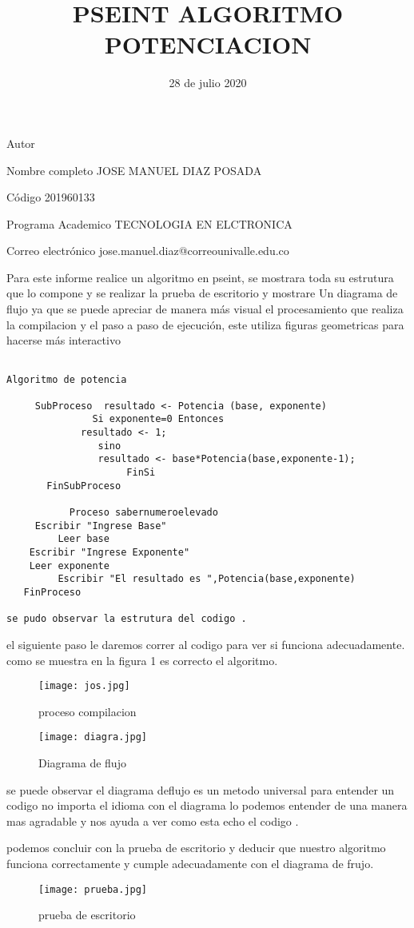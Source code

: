 \documentclass[letterpaper,12pt]{article}
\title{PSEINT ALGORITMO  POTENCIACION }
\date{28 de julio 2020}
\begin{document}
\maketitle

 \begin{cvlist}{Autor}
	\item[Nombre completo]  JOSE MANUEL DIAZ POSADA
	\item[Código]201960133 
	\item[Programa Academico]TECNOLOGIA EN ELCTRONICA 
	\item[Correo electrónico] jose.manuel.diaz@correounivalle.edu.co
\end{cvlist}

Para este informe realice un algoritmo en pseint, se mostrara toda su estrutura que lo compone y se realizar la prueba de escritorio y  mostrare Un diagrama de flujo ya que se puede apreciar de manera más visual el procesamiento que realiza la compilacion y el paso a paso de ejecución, este utiliza  figuras geometricas para hacerse más interactivo
\begin{verbatim}

Algoritmo de potencia

     SubProceso  resultado <- Potencia (base, exponente)
               Si exponente=0 Entonces
             resultado <- 1;
                sino 
                resultado <- base*Potencia(base,exponente-1); 
                     FinSi
       FinSubProceso

           Proceso sabernumeroelevado 
     Escribir "Ingrese Base"
         Leer base
    Escribir "Ingrese Exponente"
    Leer exponente
         Escribir "El resultado es ",Potencia(base,exponente)
   FinProceso

se pudo observar la estrutura del codigo .
\end{verbatim}
el siguiente paso  le daremos correr al codigo para ver si funciona adecuadamente.
como se muestra en la figura 1 es correcto el algoritmo.
\begin{figure}[h!]
\centering
\texttt{[image: jos.jpg]}
\caption{proceso compilacion}
\label{Figura: 1}
\end{figure}

\begin{figure}[h!] 
\centering
\texttt{[image: diagra.jpg]} 
\caption{Diagrama de flujo}
\label{Figura: 2}
\end{figure}

\textrm {se puede observar el diagrama deflujo es un metodo universal para entender un codigo no importa el idioma con el diagrama lo podemos entender de una manera mas agradable y nos ayuda a ver como esta echo el codigo .}

 podemos concluir con la prueba de escritorio  y deducir que nuestro algoritmo
funciona correctamente y cumple adecuadamente con el diagrama de frujo.

\begin{figure}[h!] 
\centering
\texttt{[image: prueba.jpg]} 
\caption{prueba de escritorio}
\label{Figura: 3}
\end{figure}
\end{document}
